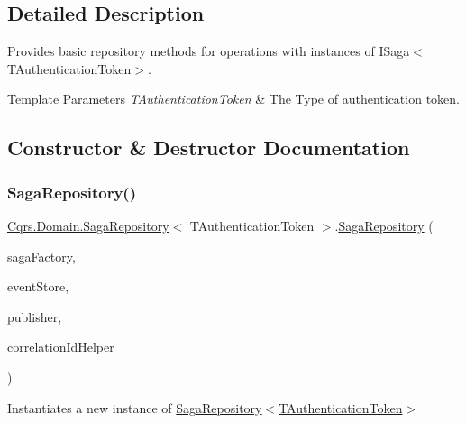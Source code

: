 \subsection{Detailed Description}
Provides basic repository methods for operations with instances of I\+Saga$<$\+T\+Authentication\+Token$>$. 


\begin{DoxyTemplParams}{Template Parameters}
{\em T\+Authentication\+Token} & The Type of authentication token.\\
\hline
\end{DoxyTemplParams}


\subsection{Constructor \& Destructor Documentation}
\mbox{\label{classCqrs_1_1Domain_1_1SagaRepository_a2981231b25fa89133ab50796cd352fbf_a2981231b25fa89133ab50796cd352fbf}} 
\subsubsection{\texorpdfstring{Saga\+Repository()}{SagaRepository()}}
{\footnotesize\ttfamily \hyperlink{classCqrs_1_1Domain_1_1SagaRepository}{Cqrs.\+Domain.\+Saga\+Repository}$<$ T\+Authentication\+Token $>$.\hyperlink{classCqrs_1_1Domain_1_1SagaRepository}{Saga\+Repository} (\begin{DoxyParamCaption}\item[{\hyperlink{interfaceCqrs_1_1Domain_1_1Factories_1_1IAggregateFactory}{I\+Aggregate\+Factory}}]{saga\+Factory,  }\item[{\hyperlink{interfaceCqrs_1_1Events_1_1IEventStore}{I\+Event\+Store}$<$ T\+Authentication\+Token $>$}]{event\+Store,  }\item[{\hyperlink{interfaceCqrs_1_1Events_1_1IEventPublisher}{I\+Event\+Publisher}$<$ T\+Authentication\+Token $>$}]{publisher,  }\item[{I\+Correlation\+Id\+Helper}]{correlation\+Id\+Helper }\end{DoxyParamCaption})}



Instantiates a new instance of \hyperlink{classCqrs_1_1Domain_1_1SagaRepository_a2981231b25fa89133ab50796cd352fbf_a2981231b25fa89133ab50796cd352fbf}{Saga\+Repository$<$\+T\+Authentication\+Token$>$} 



